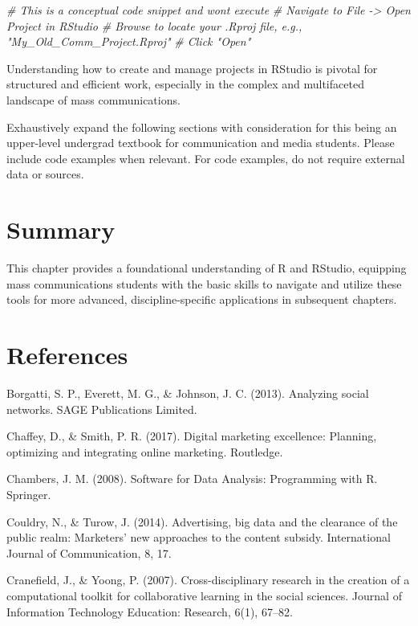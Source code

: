 \documentclass[
  b5paper]{book}
\newenvironment{Shaded}{\begin{snugshade}}{\end{snugshade}}
\newcommand{\CommentTok}[1]{\textcolor[rgb]{0.56,0.35,0.01}{\textit{#1}}}
\begin{document}
\begin{Shaded}
\begin{Highlighting}[]
\CommentTok{\# This is a conceptual code snippet and won\textquotesingle{}t execute}
\CommentTok{\# Navigate to File {-}\textgreater{} Open Project in RStudio}
\CommentTok{\# Browse to locate your .Rproj file, e.g., "My\_Old\_Comm\_Project.Rproj"}
\CommentTok{\# Click "Open"}
\end{Highlighting}
\end{Shaded}

Understanding how to create and manage projects in RStudio is pivotal for structured and efficient work, especially in the complex and multifaceted landscape of mass communications.

Exhaustively expand the following sections with consideration for this being an upper-level undergrad textbook for communication and media students. Please include code examples when relevant. For code examples, do not require external data or sources.

\hypertarget{summary}{%
\section{Summary}\label{summary}}

This chapter provides a foundational understanding of R and RStudio, equipping mass communications students with the basic skills to navigate and utilize these tools for more advanced, discipline-specific applications in subsequent chapters.

\hypertarget{references-1}{%
\section{References}\label{references-1}}

Borgatti, S. P., Everett, M. G., \& Johnson, J. C. (2013). Analyzing social networks. SAGE Publications Limited.

Chaffey, D., \& Smith, P. R. (2017). Digital marketing excellence: Planning, optimizing and integrating online marketing. Routledge.

Chambers, J. M. (2008). Software for Data Analysis: Programming with R. Springer.

Couldry, N., \& Turow, J. (2014). Advertising, big data and the clearance of the public realm: Marketers' new approaches to the content subsidy. International Journal of Communication, 8, 17.

Cranefield, J., \& Yoong, P. (2007). Cross-disciplinary research in the creation of a computational toolkit for collaborative learning in the social sciences. Journal of Information Technology Education: Research, 6(1), 67--82.
\end{document}
